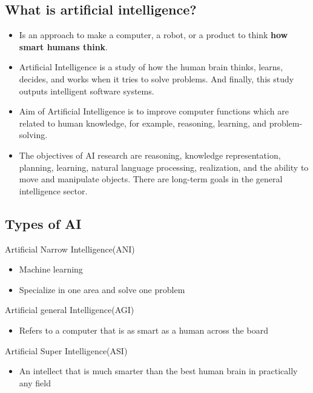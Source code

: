\documentclass[a4paper, 12pt]{article}
\begin{document}
    \subsection{What is artificial intelligence?}
        \begin{itemize}
            \item Is an approach to make a computer, a robot, or a product to think \textbf{how smart humans think}.
            \item Artificial Intelligence is a study of how the human brain thinks, learns, decides, and works when it tries to solve problems. And finally, this study outputs intelligent software systems.
            \item Aim of Artificial Intelligence is to improve computer functions which are related to human knowledge, for example, reasoning, learning, and problem-solving.
            \item The objectives of AI research are reasoning, knowledge representation, planning, learning, natural language processing, realization, and the ability to move and manipulate objects. There are long-term goals in the general intelligence sector.
        \end{itemize}
    
    \subsection{Types of AI}
        Artificial Narrow Intelligence(ANI)
        \begin{itemize}
            \item Machine learning
            \item Specialize in one area and solve one problem
        \end{itemize}

        Artificial general Intelligence(AGI)
        \begin{itemize}
            \item Refers to a computer that is as smart as a human across the board
        \end{itemize}

        Artificial Super Intelligence(ASI)
        \begin{itemize}
            \item An intellect that is much smarter than the best human brain in practically any field
        \end{itemize}
\end{document}
